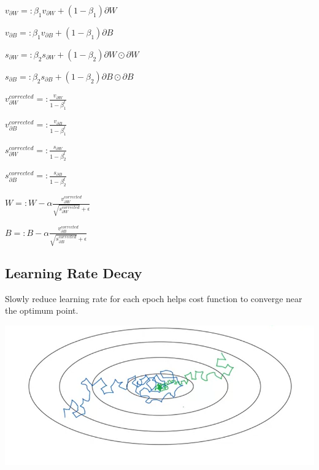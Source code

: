 \documentclass{article}
\begin{document}
\noindent \hspace{1cm} \(v_{\partial W} =: \beta_{1} v_{\partial W} + (1 - \beta_{1}) \partial W\)

\noindent \hspace{1cm} \(v_{\partial B} =: \beta_{1} v_{\partial B} + (1 - \beta_{1}) \partial B\)

\noindent \hspace{1cm} \(s_{\partial W} =: \beta_{2} s_{\partial W} + (1 - \beta_{2}) \partial W \odot \partial W\)

\noindent \hspace{1cm} \(s_{\partial B} =: \beta_{2} s_{\partial B} + (1 - \beta_{2}) \partial B \odot \partial B\)

\noindent \hspace{1cm} \(v^{corrected}_{\partial W} =: \frac{v_{\partial W}}{1 - \beta^{t}_{1}}\)

\noindent \hspace{1cm} \(v^{corrected}_{\partial B} =: \frac{v_{\partial B}}{1 - \beta^{t}_{1}}\)

\noindent \hspace{1cm} \(s^{corrected}_{\partial W} =: \frac{s_{\partial W}}{1 - \beta^{t}_{2}}\)

\noindent \hspace{1cm} \(s^{corrected}_{\partial B} =: \frac{s_{\partial B}}{1 - \beta^{t}_{2}}\)

\noindent \hspace{1cm} \(W =: W - \alpha \frac{v^{corrected}_{\partial W}}{\sqrt{s^{corrected}_{\partial W}} + \epsilon}\)

\noindent \hspace{1cm} \(B =: B - \alpha \frac{v^{corrected}_{\partial B}}{\sqrt{s^{corrected}_{\partial B}} + \epsilon}\)

\subsection{Learning Rate Decay}

Slowly reduce learning rate for each epoch helps cost function to converge near the optimum point.

\begin{center}
\includegraphics[scale=0.4]{./images/learning_rate_decay.png}
\end{center}
\end{document}
